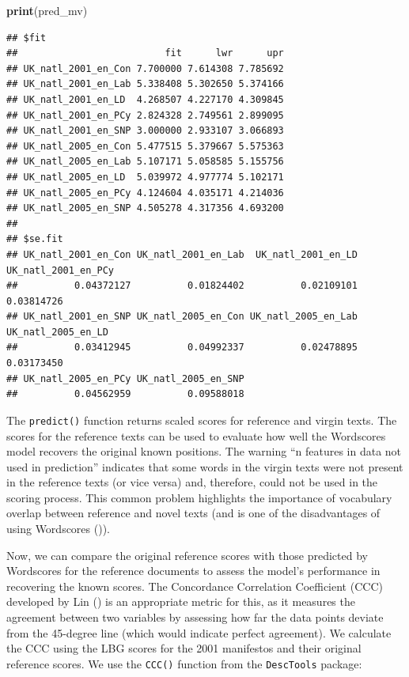 \documentclass[
]{book}
\newenvironment{Shaded}{\begin{snugshade}}{\end{snugshade}}
\newcommand{\FunctionTok}[1]{\textcolor[rgb]{0.13,0.29,0.53}{\textbf{#1}}}
\newcommand{\NormalTok}[1]{#1}
\begin{document}
\begin{Shaded}
\begin{Highlighting}[]
\FunctionTok{print}\NormalTok{(pred\_mv)}
\end{Highlighting}
\end{Shaded}

\begin{verbatim}
## $fit
##                          fit      lwr      upr
## UK_natl_2001_en_Con 7.700000 7.614308 7.785692
## UK_natl_2001_en_Lab 5.338408 5.302650 5.374166
## UK_natl_2001_en_LD  4.268507 4.227170 4.309845
## UK_natl_2001_en_PCy 2.824328 2.749561 2.899095
## UK_natl_2001_en_SNP 3.000000 2.933107 3.066893
## UK_natl_2005_en_Con 5.477515 5.379667 5.575363
## UK_natl_2005_en_Lab 5.107171 5.058585 5.155756
## UK_natl_2005_en_LD  5.039972 4.977774 5.102171
## UK_natl_2005_en_PCy 4.124604 4.035171 4.214036
## UK_natl_2005_en_SNP 4.505278 4.317356 4.693200
## 
## $se.fit
## UK_natl_2001_en_Con UK_natl_2001_en_Lab  UK_natl_2001_en_LD UK_natl_2001_en_PCy 
##          0.04372127          0.01824402          0.02109101          0.03814726 
## UK_natl_2001_en_SNP UK_natl_2005_en_Con UK_natl_2005_en_Lab  UK_natl_2005_en_LD 
##          0.03412945          0.04992337          0.02478895          0.03173450 
## UK_natl_2005_en_PCy UK_natl_2005_en_SNP 
##          0.04562959          0.09588018
\end{verbatim}

The \texttt{predict()} function returns scaled scores for reference and virgin texts. The scores for the reference texts can be used to evaluate how well the Wordscores model recovers the original known positions. The warning ``n features in data not used in prediction'' indicates that some words in the virgin texts were not present in the reference texts (or vice versa) and, therefore, could not be used in the scoring process. This common problem highlights the importance of vocabulary overlap between reference and novel texts (and is one of the disadvantages of using Wordscores ()).

Now, we can compare the original reference scores with those predicted by Wordscores for the reference documents to assess the model's performance in recovering the known scores. The Concordance Correlation Coefficient (CCC) developed by Lin () is an appropriate metric for this, as it measures the agreement between two variables by assessing how far the data points deviate from the 45-degree line (which would indicate perfect agreement). We calculate the CCC using the LBG scores for the 2001 manifestos and their original reference scores. We use the \texttt{CCC()} function from the \texttt{DescTools} package:
\end{document}
